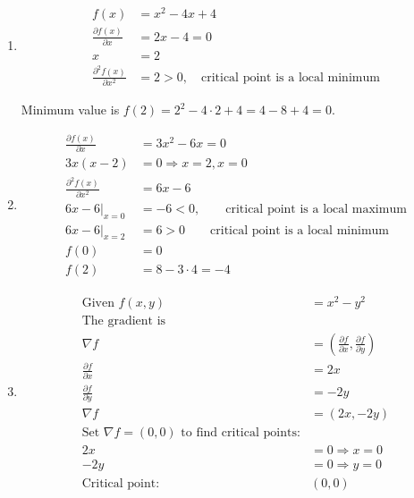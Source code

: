 \documentclass[12pt, xcolor=dvipsnames,svgnames,x11names]{article}
\begin{document}
\begin{answerbox}

\begin{enumerate}
\item
\begin{align*}
f(x) & = x^2 - 4x + 4\\
\frac{\partial f(x)}{\partial x} & = 2x - 4 = 0\\
x & = 2\\
\frac{\partial^2 f(x)}{\partial x^2} & = 2 > 0, \quad \text{critical point is a local minimum}
\end{align*}

Minimum value is $f(2) = 2^2 - 4\cdot 2  + 4 = 4 - 8 + 4  = 0$.


\item 

\begin{align*}
\frac{\partial f(x)}{\partial x} & = 3x^2 - 6x  = 0\\
3x(x-2) & = 0 \Rightarrow x= 2 , x = 0\\
\frac{\partial^2 f(x)}{\partial x^2} & = 6x -6 \\
6x - 6 \bigg|_{x = 0} & = -6 <0, \quad \quad \text{critical point is a local maximum} \\
6x - 6 \bigg|_{x = 2} & = 6  > 0 \quad \quad \text{critical point is a local minimum}\\
f(0) & = 0\\
f(2) & = 8 - 3\cdot 4 = -4
\end{align*}

\item 

\begin{align*}
\text{Given } f(x, y) &= x^2 - y^2 \\
\text{The gradient is } \\
\nabla f &= \left( \frac{\partial f}{\partial x}, \frac{\partial f}{\partial y} \right) \\
\frac{\partial f}{\partial x} &= 2x \\
\frac{\partial f}{\partial y} &= -2y \\
\nabla f &= (2x, -2y) \\
\text{Set } \nabla f = (0, 0) \text{ to find critical points:} \\
2x &= 0 \Rightarrow x = 0 \\
-2y &= 0 \Rightarrow y = 0 \\
\text{Critical point: } & (0, 0)
\end{align*}


\end{enumerate}
\end{answerbox}
\end{document}
